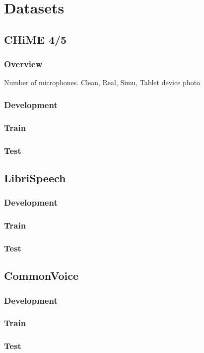 \chapter{Datasets}
\section{CHiME 4/5}
\subsection{Overview}
Number of microphones.
Clean, Real, Simu,
Tablet device photo
\subsection{Development}
\subsection{Train}
\subsection{Test}

\section{LibriSpeech}
\subsection{Development}
\subsection{Train}
\subsection{Test}

\section{CommonVoice}
\subsection{Development}
\subsection{Train}
\subsection{Test}


